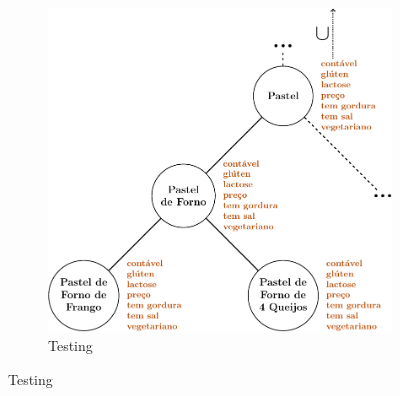 \documentclass[10pt,a4paper]{article}
\begin{document}
\begin{figure}
\begin{subfigure}{0.49\linewidth}
			\includegraphics[width=0.9\linewidth]{../bottomup-5.pdf}
			\caption{Testing}
		\end{subfigure}
	\end{figure}
\end{document}
